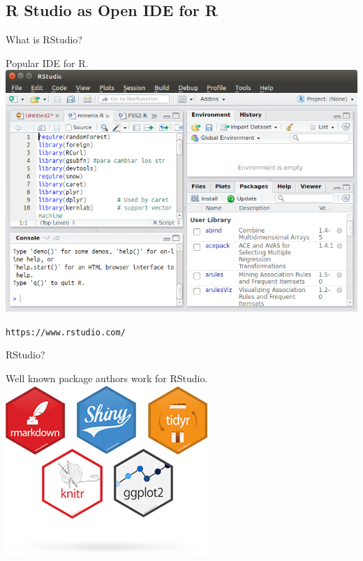 \documentclass{beamer}
\begin{document}

\subsection[R Studio]{R Studio as Open IDE for R}


\begin{frame}{What is RStudio?} %

Popular IDE for R.
\includegraphics[height=.50\textwidth]{figs/RStudio.png}

\texttt{https://www.rstudio.com/}

\end{frame}


\begin{frame}{RStudio?} %

Well known package authors work for RStudio.
\includegraphics[height=.50\textwidth]{figs/r-packages.png}


\end{frame}
\end{document}
